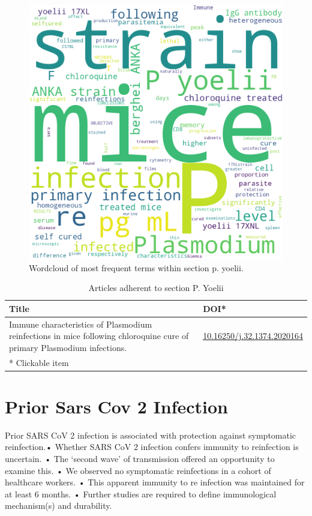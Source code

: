 \documentclass{qqtarticle}
\begin{document}
        \begin{figure}[H]
            \centering
            \includegraphics[width=.75\linewidth]{img/p.yoelii.png}
            \caption{Wordcloud of most frequent terms within section p. yoelii.}
            \label{fig:wcl_p.yoelii}
        \end{figure}

        \begin{table}[H]
        \scriptsize
        \centering
        \caption{Articles adherent to section P. Yoelii}
        \renewcommand{\arraystretch}{1.5}
        \begin{tabular}{p{}l}
            \toprule 
            Title & DOI* \\     \midrule Immune characteristics of Plasmodium reinfections in mice following chloroquine cure of primary Plasmodium infections. \cite{Immunechae26fb43e} & \href{https://dx.doi.org/10.16250/j.32.1374.2020164}{10.16250/j.32.1374.2020164}\\     \midrule
            * Clickable item \\
            \bottomrule
        \end{tabular}
        \label{tab:topic8}
        \end{table}\section{Prior Sars Cov 2 Infection}
            Prior SARS CoV 2 infection is associated with protection against symptomatic reinfection.• Whether SARS CoV 2 infection confers immunity to reinfection is uncertain. • The ‘second wave’ of transmission offered an opportunity to examine this. • We observed no symptomatic reinfections in a cohort of healthcare workers. • This apparent immunity to re infection was maintained for at least 6 months. • Further studies are required to define immunological mechanism(s) and durability.
\end{document}
